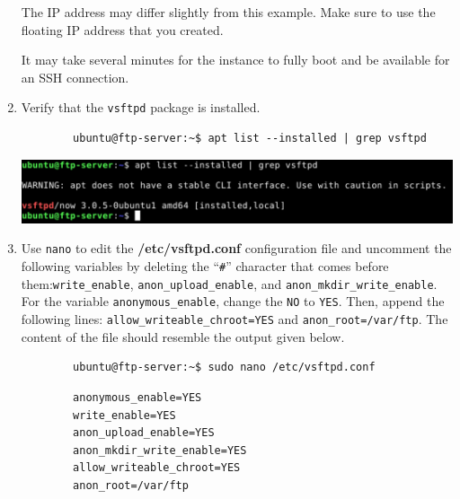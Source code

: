 \documentclass[letterpaper, 12pt]{article}
\begin{document}
\begin{enumerate}
    \begin{notebox}
        The IP address may differ slightly from this example. Make sure to use the floating IP address that you created.
    \end{notebox}

    \begin{notebox}
        It may take several minutes for the instance to fully boot and be available for an SSH connection.
    \end{notebox}

    \item Verify that the \texttt{vsftpd} package is installed.
    \begin{lstlisting}
        ubuntu@ftp-server:~$ apt list --installed | grep vsftpd
    \end{lstlisting}

    \begin{center}
        \includegraphics[width=\linewidth]{images/part1/step42.png}
    \end{center}

    \item Use \texttt{nano} to edit the \textbf{/etc/vsftpd.conf} configuration file and uncomment the following
    variables by deleting the ``\texttt{\#}'' character that comes before them:\texttt{write\_enable},
    \texttt{anon\_upload\_enable}, and \texttt{anon\_mkdir\_write\_enable}. For the variable \texttt{anonymous\_enable},
    change the \texttt{NO} to \texttt{YES}. Then, append the following lines:
    \texttt{allow\_writeable\_chroot=YES} and \texttt{anon\_root=/var/ftp}. The content of the file should resemble the
    output given below.
    \begin{lstlisting}
        ubuntu@ftp-server:~$ sudo nano /etc/vsftpd.conf
    \end{lstlisting}
    \begin{lstlisting}
        anonymous_enable=YES
        write_enable=YES
        anon_upload_enable=YES
        anon_mkdir_write_enable=YES
        allow_writeable_chroot=YES
        anon_root=/var/ftp
    \end{lstlisting}


\end{enumerate}
\end{document}
